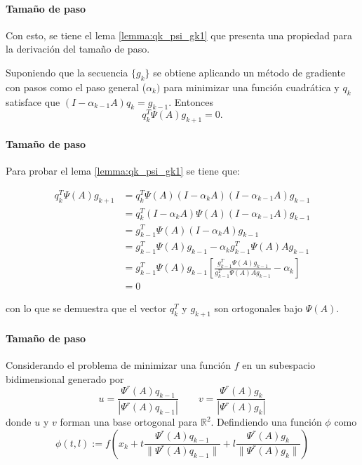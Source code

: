 \begin{frame}{\insertsectionhead}
    \framesubtitle{Tamaño de paso}
    Con esto, se tiene el lema \ref{lemma:qk_psi_gk1} que presenta una propiedad para la derivación del tamaño de paso.
    \begin{lema}
        Suponiendo que la secuencia $\{g_k\}$ se obtiene aplicando un método de gradiente con pasos como el paso general ($\alpha_k)$ para minimizar una función cuadrática y $q_k$ satisface que $(I-\alpha_{k-1}A)q_k = g_{k-1}$. Entonces
        \begin{equation*}
            q_k^T\Psi(A)g_{k+1} = 0.
        \end{equation*}
        \label{lemma:qk_psi_gk1}
    \end{lema}
\end{frame}

\begin{frame}{\insertsectionhead}
    \framesubtitle{Tamaño de paso}
    Para probar el lema \ref{lemma:qk_psi_gk1} se tiene que:

    \begin{align*}
        q_k^T \Psi(A)g_{k+1} & = q_k^T\Psi(A)(I-\alpha_kA)(I-\alpha_{k-1}A)g_{k-1}                                                    \\
                             & = q_k^T(I-\alpha_kA)\Psi(A)(I-\alpha_{k-1}A)g_{k-1}                                                    \\
                             & = g_{k-1}^T\Psi(A)(I-\alpha_kA)g_{k-1}                                                                 \\
                             & =g_{k-1}^T\Psi(A)g_{k-1}-\alpha_kg_{k-1}^T\Psi(A)Ag_{k-1}                                              \\
                             & =g_{k-1}^T\Psi(A)g_{k-1}\left[\frac{g_{k-1}^T\Psi(A)g_{k-1}}{g_{k-1}^T\Psi(A)Ag_{k-1}}-\alpha_k\right] \\
                             & = 0
    \end{align*}

    con lo que se demuestra que el vector $q_k^T$ y $g_{k+1}$ son ortogonales bajo $\Psi(A)$.
\end{frame}

\begin{frame}{\insertsectionhead}
    \framesubtitle{Tamaño de paso}
    Considerando el problema de minimizar una función $f$ en un subespacio bidimensional generado por
    \begin{equation}
        u = \frac{\Psi^r(A)q_{k-1}}{|\Psi^r(A)q_{k-1}|} \qquad
        v = \frac{\Psi^r(A)g_{k}}{|\Psi^r(A)g_{k}|} \label{eq:u_v}
    \end{equation}
    donde $u$ y $v$ forman una base ortogonal para $\mathbb{R}^2$. Defindiendo una función $\phi$ como
    \begin{equation}
        \phi(t,l):=f\left(x_k+t\frac{\Psi^r(A)q_{k-1}}{\|\Psi^r(A)q_{k-1}\|} + l \frac{\Psi^r(A)g_{k}}{\|\Psi^r(A)g_{k}\|}\right) \label{eq:phi_definition}
    \end{equation}
\end{frame}

